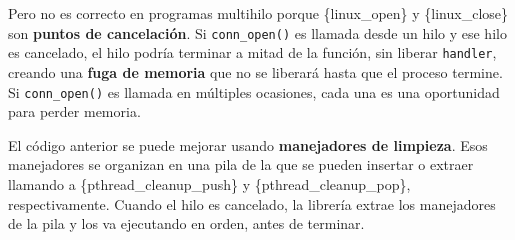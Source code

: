 Pero no es correcto en programas multihilo porque \{linux\_open\} y
\{linux\_close\} son \textbf{puntos de cancelación}. Si
\texttt{conn\_open()} es llamada desde un hilo y ese hilo es cancelado,
el hilo podría terminar a mitad de la función, sin liberar
\texttt{handler}, creando una \textbf{fuga de memoria} que no se
liberará hasta que el proceso termine. Si \texttt{conn\_open()} es
llamada en múltiples ocasiones, cada una es una oportunidad para perder
memoria.

El código anterior se puede mejorar usando \textbf{manejadores de
limpieza}{}. Esos manejadores se organizan en una pila de la que se
pueden insertar o extraer llamando a \{pthread\_cleanup\_push\} y
\{pthread\_cleanup\_pop\}, respectivamente. Cuando el hilo es cancelado,
la librería extrae los manejadores de la pila y los va ejecutando en
orden, antes de terminar.

